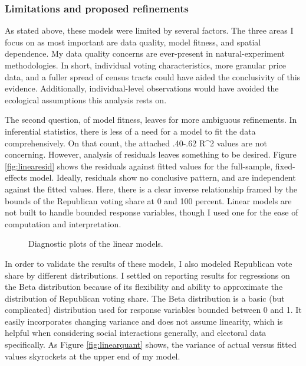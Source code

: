 \documentclass[
]{article}
\begin{document}
\hypertarget{limitations}{%
\subsubsection{Limitations and proposed refinements}\label{limitations}}

As stated above, these models were limited by several factors.
The three areas I focus on as most important are data quality, model fitness, and spatial dependence.
My data quality concerns are ever-present in natural-experiment methodologies.
In short, individual voting characteristics, more granular price data, and a fuller spread of census tracts could have aided the conclusivity of this evidence.
Additionally, individual-level observations would have avoided the ecological assumptions this analysis rests on.

The second question, of model fitness, leaves for more ambiguous refinements.
In inferential statistics, there is less of a need for a model to fit the data comprehensively.
On that count, the attached .40-.62 R\^{}2 values are not concerning.
However, analysis of residuals leaves something to be desired.
Figure \ref{fig:linearesid} shows the residuals against fitted values for the full-sample, fixed-effects model.
Ideally, residuals show no conclusive pattern, and are independent against the fitted values.
Here, there is a clear inverse relationship framed by the bounds of the Republican voting share at 0 and 100 percent.
Linear models are not built to handle bounded response variables, though I used one for the ease of computation and interpretation.

\begin{figure}

{\centering {}

}

\caption{Diagnostic plots of the linear models.}\label{fig:linear}
\end{figure}

In order to validate the results of these models, I also modeled Republican vote share by different distributions.
I settled on reporting results for regressions on the Beta distribution because of its flexibility and ability to approximate the distribution of Republican voting share.
The Beta distribution is a basic (but complicated) distribution used for response variables bounded between 0 and 1.
It easily incorporates changing variance and does not assume linearity, which is helpful when considering social interactions generally, and electoral data specifically.
As Figure \ref{fig:linearquant} shows, the variance of actual versus fitted values skyrockets at the upper end of my model.
\end{document}
